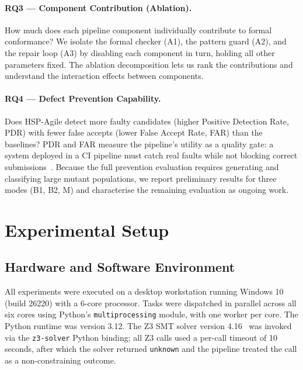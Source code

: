 \paragraph{RQ3 --- Component Contribution (Ablation).}
How much does each pipeline component individually contribute to formal conformance?
We isolate the formal checker (A1), the pattern guard (A2), and the repair loop (A3)
by disabling each component in turn, holding all other parameters fixed.  The ablation
decomposition lets us rank the contributions and understand the interaction effects
between components.

\paragraph{RQ4 --- Defect Prevention Capability.}
Does HSP-Agile detect more faulty candidates (higher Positive Detection Rate, PDR)
with fewer false accepts (lower False Accept Rate, FAR) than the baselines?  PDR and
FAR measure the pipeline's utility as a quality gate: a system deployed in a CI
pipeline must catch real faults while not blocking correct submissions~\citep{demillo1978mutation,offutt1992mutation}.
Because the full prevention evaluation requires generating and classifying large mutant
populations, we report preliminary results for three modes (B1, B2, M) and
characterise the remaining evaluation as ongoing work.

\section{Experimental Setup}
\label{sec:exp:setup}

\subsection{Hardware and Software Environment}

All experiments were executed on a desktop workstation running Windows 10
(build 26220) with a 6-core processor.  Tasks were dispatched in parallel across
all six cores using Python's \texttt{multiprocessing} module, with one worker per
core.  The Python runtime was version 3.12.  The Z3 SMT solver version 4.16~\citep{demoura2008z3,barrett2018smt}
was invoked via the \texttt{z3-solver} Python binding; all Z3 calls used a per-call
timeout of 10 seconds, after which the solver returned \texttt{unknown} and the
pipeline treated the call as a non-constraining outcome.

